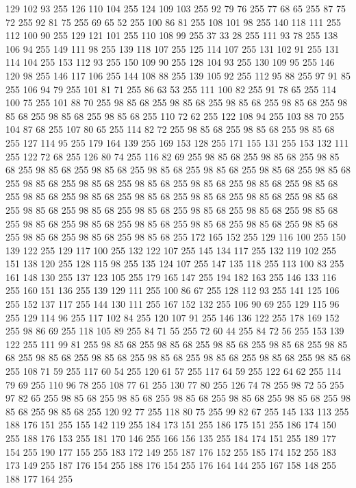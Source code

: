 129 102 93 255 126 110 104 255 124 109 103 255 92 79 76 255 77 68 65 255 87 75 72 255 92 81 75 255 69 65 52 255 100 86 81 255 108 101 98 255 140 118 111 255 112 100 90 255 129 121 101 255 110 108 99 255 37 33 28 255 111 93 78 255 138 106 94 255 149 111 98 255 139 118 107 255 125 114 107 255 131 102 91 255 131 114 104 255 153 112 93 255 150 109 90 255 128 104 93 255 130 109 95 255 146 120 98 255 146 117 106 255 144 108 88 255 139 105 92 255 112 95 88 255 97 91 85 255 106 94 79 255 101 81 71 255 86 63 53 255 111 100 82 255 91 78 65 255 114 100 75 255 101 88 70 255 98 85 68 255 98 85 68 255 98 85 68 255 98 85 68 255 98 85 68 255 98 85 68 255 98 85 68 255 110 72 62 255 122 108 94 255 103 88 70 255 104 87 68 255 107 80 65 255 114 82 72 255 98 85 68 255 98 85 68 255 98 85 68 255 127 114 95 255 179 164 139 255 169 153 128 255 171 155 131 255 153 132 111 255 122 72 68 255 126 80 74 255 116 82 69 255 98 85 68 255
98 85 68 255 98 85 68 255 98 85 68 255 98 85 68 255 98 85 68 255 98 85 68 255 98 85 68 255 98 85 68 255 98 85 68 255 98 85 68 255 98 85 68 255 98 85 68 255 98 85 68 255 98 85 68 255 98 85 68 255 98 85 68 255 98 85 68 255 98 85 68 255 98 85 68 255 98 85 68 255 98 85 68 255 98 85 68 255 98 85 68 255 98 85 68 255 98 85 68 255 98 85 68 255 98 85 68 255 98 85 68 255 98 85 68 255 98 85 68 255 98 85 68 255 98 85 68 255 98 85 68 255 98 85 68 255 98 85 68 255 172 165 152 255 129 116 100 255 150 139 122 255 129 117 100 255 132 122 107 255 145 134 117 255 132 119 102 255 151 138 120 255 128 115 98 255 135 124 107 255 147 135 118 255 113 100 83 255 161 148 130 255 137 123 105 255 179 165 147 255 194 182 163 255 146 133 116 255 160 151 136 255 139 129 111 255 100 86 67 255 128 112 93 255 141 125 106 255 152 137 117 255 144 130 111 255 167 152 132 255 106 90 69 255 129 115 96 255 129 114 96 255 117 102 84 255
120 107 91 255 146 136 122 255 178 169 152 255 98 86 69 255 118 105 89 255 84 71 55 255 72 60 44 255 84 72 56 255 153 139 122 255 111 99 81 255 98 85 68 255 98 85 68 255 98 85 68 255 98 85 68 255 98 85 68 255 98 85 68 255 98 85 68 255 98 85 68 255 98 85 68 255 98 85 68 255 98 85 68 255 108 71 59 255 117 60 54 255 120 61 57 255 117 64 59 255 122 64 62 255 114 79 69 255 110 96 78 255 108 77 61 255 130 77 80 255 126 74 78 255 98 72 55 255 97 82 65 255 98 85 68 255 98 85 68 255 98 85 68 255 98 85 68 255 98 85 68 255 98 85 68 255 98 85 68 255 120 92 77 255 118 80 75 255 99 82 67 255 145 133 113 255 188 176 151 255 155 142 119 255 184 173 151 255 186 175 151 255 186 174 150 255 188 176 153 255 181 170 146 255 166 156 135 255 184 174 151 255 189 177 154 255 190 177 155 255 183 172 149 255 187 176 152 255 185 174 152 255 183 173 149 255 187 176 154 255 188 176 154 255 176 164 144 255 167 158 148 255 188 177 164 255
